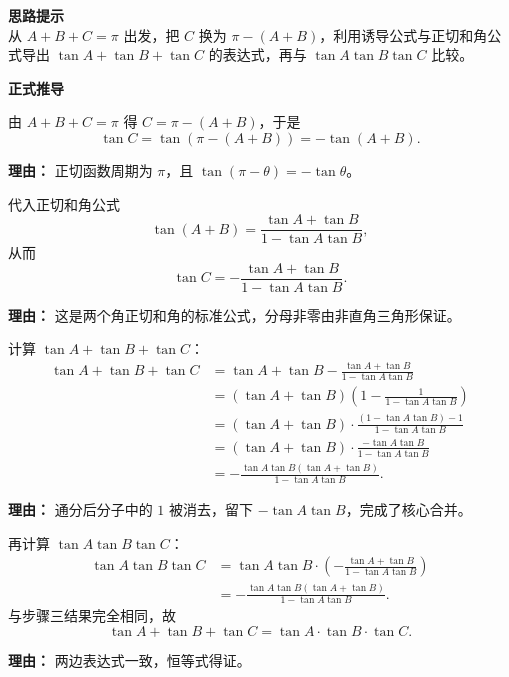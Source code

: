 \begin{proofbox}
\textbf{\textcolor{CProof}{思路提示}}
\\
从 $A+B+C=\pi$ 出发，把 $C$ 换为 $\pi-(A+B)$，利用诱导公式与正切和角公式导出 $\tan A+\tan B+\tan C$ 的表达式，再与 $\tan A\tan B\tan C$ 比较。

\medskip
\textbf{\textcolor{CProof}{正式推导}}
\begin{description}[style=nextline, leftmargin=2.8em, labelsep=0.5em, itemsep=0.55em]
    \item[\textbf{步骤一（内角代换）：}] 由 $A+B+C=\pi$ 得 $C=\pi-(A+B)$，于是
    \[
    \tan C = \tan(\pi-(A+B)) = -\tan(A+B).
    \]
    \par\textbf{理由：}
    正切函数周期为 $\pi$，且 $\tan(\pi-\theta) = -\tan\theta$。

    \item[\textbf{步骤二（和角展开）：}] 代入正切和角公式
    \[
    \tan(A+B) = \frac{\tan A + \tan B}{1 - \tan A \tan B},
    \]
    从而
    \[
    \tan C = -\frac{\tan A + \tan B}{1 - \tan A \tan B}.
    \]
    \par\textbf{理由：}
    这是两个角正切和角的标准公式，分母非零由非直角三角形保证。

    \item[\textbf{步骤三（求和通分）：}] 计算 $\tan A+\tan B+\tan C$：
    \[
    \begin{aligned}
    \tan A+\tan B+\tan C
    &= \tan A+\tan B - \frac{\tan A+\tan B}{1-\tan A\tan B} \\
    &= (\tan A+\tan B)\left(1 - \frac{1}{1-\tan A\tan B}\right) \\
    &= (\tan A+\tan B)\cdot\frac{(1-\tan A\tan B)-1}{1-\tan A\tan B} \\
    &= (\tan A+\tan B)\cdot\frac{-\tan A\tan B}{1-\tan A\tan B} \\
    &= -\frac{\tan A\tan B(\tan A+\tan B)}{1-\tan A\tan B}.
    \end{aligned}
    \]
    \par\textbf{理由：}
    通分后分子中的 $1$ 被消去，留下 $-\tan A\tan B$，完成了核心合并。

    \item[\textbf{步骤四（乘积验证）：}] 再计算 $\tan A\tan B\tan C$：
    \[
    \begin{aligned}
    \tan A\tan B\tan C
    &= \tan A\tan B\cdot\left(-\frac{\tan A+\tan B}{1-\tan A\tan B}\right) \\
    &= -\frac{\tan A\tan B(\tan A+\tan B)}{1-\tan A\tan B}.
    \end{aligned}
    \]
    与步骤三结果完全相同，故
    \[
    \tan A+\tan B+\tan C = \tan A\cdot\tan B\cdot\tan C.
    \]
    \par\textbf{理由：}
    两边表达式一致，恒等式得证。


\end{description}
\end{proofbox}

